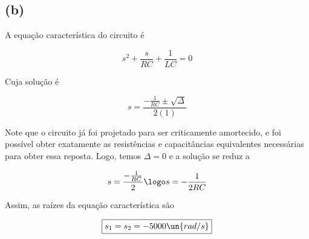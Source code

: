 \subsection*{(b)}

A equação característica do circuito é   

\begin{equation}\label{eq:8.17.2}
    s^2 + \frac{s}{RC} + \frac{1}{LC} = 0
\end{equation}

Cuja solução é  

\[ s = \frac{-\frac{1}{RC} \pm \sqrt{\Delta}}{2(1)} \]

Note que o circuito já foi projetado para ser criticamente amortecido, e foi possível obter exatamente as resistências
e capacitâncias equivalentes necessárias para obter essa reposta. Logo, temos $\Delta = 0$ e a solução se reduz a

\[ s = \frac{-\frac{1}{RC}}{2} \logo s = -\frac{1}{2RC} \]

Assim, as raízes da equação característica são  

\[ \boxed{s_1 = s_2 = -5000 \un{rad/s} }  \]


